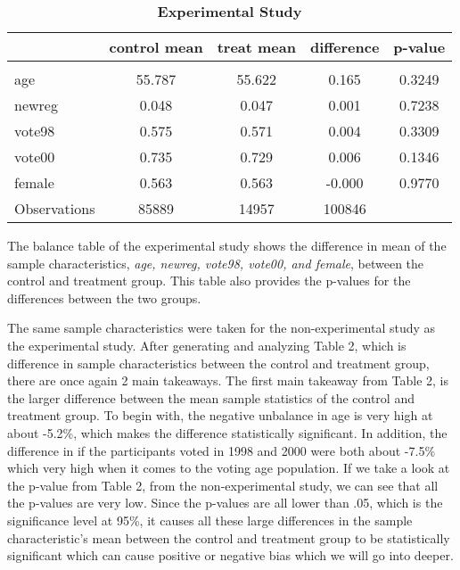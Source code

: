 \documentclass[a4paper]{article}
\begin{document}
\begin{table}[H]
\caption{\textbf{Experimental Study}}
\begin{tabular}{|l|c|c|c|c|}
\hline
             & control mean & treat mean & difference & p-value \\ \hline
             &              &            &            &         \\ \hline
age          & 55.787       & 55.622     & 0.165      & 0.3249  \\ \hline
newreg       & 0.048        & 0.047      & 0.001      & 0.7238  \\ \hline
vote98       & 0.575        & 0.571      & 0.004      & 0.3309  \\ \hline
vote00       & 0.735        & 0.729      & 0.006      & 0.1346  \\ \hline
female       & 0.563        & 0.563      & -0.000     & 0.9770  \\ \hline
Observations & 85889        & 14957      & 100846     &         \\ \hline
\end{tabular}


\RaggedRight The balance table of the experimental study shows the difference in mean of the sample characteristics, \textit{age, newreg, vote98, vote00, and female}, between the control and treatment group. This table also provides the p-values for the differences between the two groups.
\end{table}

The same sample characteristics were taken for the non-experimental study as the experimental study. After generating and analyzing Table 2, which is difference in sample characteristics between the control and treatment group, there are once again 2 main takeaways. The first main takeaway from Table 2, is the larger difference between the mean sample statistics of the control and treatment group. To begin with, the negative unbalance in age is very high at about -5.2\%, which makes the difference statistically significant. In addition, the difference in if the participants voted in 1998 and 2000 were both about -7.5\% which very high when it comes to the voting age population. If we take a look at the p-value from Table 2, from the non-experimental study, we can see that all the p-values are very low. Since the p-values are all lower than .05, which is the significance level at 95\%, it causes all these large differences in the sample characteristic's mean between the control and treatment group to be statistically significant which can cause positive or negative bias which we will go into deeper.  
\end{document}
